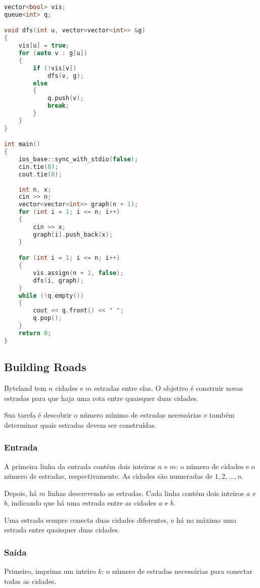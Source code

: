\begin{lstlisting}[language=C++]
vector<bool> vis;
queue<int> q;

void dfs(int u, vector<vector<int>> &g)
{
    vis[u] = true;
    for (auto v : g[u])
    {
        if (!vis[v])
            dfs(v, g);
        else
        {
            q.push(v);
            break;
        }
    }
}

int main()
{
    ios_base::sync_with_stdio(false);
    cin.tie(0);
    cout.tie(0);
    
    int n, x;
    cin >> n;
    vector<vector<int>> graph(n + 1);
    for (int i = 1; i <= n; i++)
    {
        cin >> x;
        graph[i].push_back(x);
    }

    for (int i = 1; i <= n; i++)
    {
        vis.assign(n + 1, false);
        dfs(i, graph);
    }
    while (!q.empty())
    {
        cout << q.front() << " ";
        q.pop();
    }
    return 0;
}
\end{lstlisting}

\subsection{Building Roads}

Byteland tem \( n \) cidades e \( m \) estradas entre elas. O objetivo é construir novas estradas para que haja uma rota entre quaisquer duas cidades.

Sua tarefa é descobrir o número mínimo de estradas necessárias e também determinar quais estradas devem ser construídas.

\subsubsection*{Entrada}
A primeira linha da entrada contém dois inteiros \( n \) e \( m \): o número de cidades e o número de estradas, respectivamente. As cidades são numeradas de \( 1, 2, \dots, n \).

Depois, há \( m \) linhas descrevendo as estradas. Cada linha contém dois inteiros \( a \) e \( b \), indicando que há uma estrada entre as cidades \( a \) e \( b \).

Uma estrada sempre conecta duas cidades diferentes, e há no máximo uma estrada entre quaisquer duas cidades.

\subsubsection*{Saída}
Primeiro, imprima um inteiro \( k \): o número de estradas necessárias para conectar todas as cidades.


